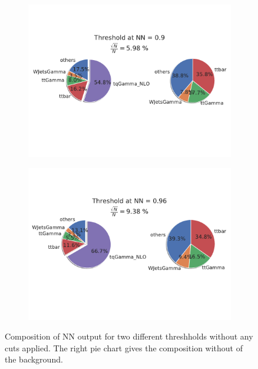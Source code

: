 \begin{figure}
    \centering
    \begin{subfigure}[b]{0.6\textwidth}
       \includegraphics[width=1\linewidth]{Plots/composition9FULL.pdf}
    \end{subfigure}
    
    \begin{subfigure}[b]{0.6\textwidth}
       \includegraphics[width=1\linewidth]{Plots/compositionTenFULL.pdf}
    \end{subfigure}
    \caption{Composition of NN output for two different threshholds without any cuts applied. The right pie chart gives the composition without of the background.}
    \label{fig:full}
\end{figure}




